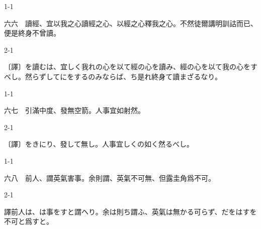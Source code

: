 \documentclass[tate,paper=b6j,jafontsize=9pt]{jlreq}
\begin{document}
\begin{azconvIndented}{1\zw}{-1\zw}

六六　讀經、宜以我之心讀經之心、以經之心釋我之心。不然徒爾講明訓詁而已、便是終身不曾讀。

\end{azconvIndented}
\begin{azconvIndented}{2\zw}{-1\zw}

〔譯〕を讀むは、宜しく我れの心を以て經の心を讀み、經の心を以て我の心をすべし。然らずしてにをするのみならば、ち是れ終身て讀まざるなり。

\end{azconvIndented}

\begin{azconvIndented}{1\zw}{-1\zw}

六七　引滿中度、發無空箭。人事宜如射然。

\end{azconvIndented}
\begin{azconvIndented}{2\zw}{-1\zw}

〔譯〕をきにり、發して無し。人事宜しくの如く然るべし。

\end{azconvIndented}

\begin{azconvIndented}{1\zw}{-1\zw}

六八　前人、謂英氣害\azconvKunten{\azconvIR}事。余則謂、英氣不可無、但露圭角爲不可。

\end{azconvIndented}
\begin{azconvIndented}{2\zw}{-1\zw}

譯前人は、は事をすと謂へり。余は則ち謂ふ、英氣は無かる可らず、だをはすを不可と爲すと。

\end{azconvIndented}
\end{document}
